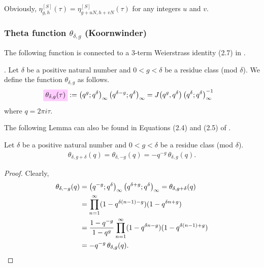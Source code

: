 \documentclass{article}
\begin{document}
Obviously, $\eta_{g,h}^{[S]}(\tau) = \eta_{g+uN,h+vN}^{[S]}(\tau)$ for
any integers $u$ and $v$.






\subsubsection{Theta function $\theta_{\delta,g}$ (Koornwinder)}

The following function is connected to a 3-term Weierstrass identity
(2.7) in \cite{Koornwinder_ThetaIdentities_2014}.

\begin{Definition}
  \cite[special case of equation (2.1)]{Koornwinder_ThetaIdentities_2014}.
  Let $\delta$ be a positive natural number and $0 < g < \delta$ be a
  residue class (mod $\delta$).
  We define the function $\theta_{\delta,g}$ as follows.
  \begin{align}
    \defineNotation[theta-delta-g-tau]{\theta_{\delta,g}(\tau)}
    &:=
      \qPochhammer{q^g}{q^\delta} \qPochhammer{q^{\delta-g}}{q^\delta}
      =
      \jacobiFunction{q^g}{q^\delta} \eulerFunction{\delta}^{-1}
      \label{eq:theta_delta-g(tau)}
  \end{align}
  where $q=2 \pi i \tau$.
\end{Definition}

The following Lemma can also be found in Equations (2.4) and (2.5) of
\cite{Koornwinder_ThetaIdentities_2014}.
\begin{Lemma}
  Let $\delta$ be a positive natural number and $0 < g < \delta$ be a
  residue class (mod $\delta$).
  \begin{gather}
    \theta_{\delta,g+\delta}(q)
      =
      \theta_{\delta,-g}(q)
      =
      -q^{-g} \, \theta_{\delta,g}(q).
      \label{eq:theta_delta-g}
  \end{gather}
\end{Lemma}
\begin{proof}
  Clearly,
  \begin{align*}
    \theta_{\delta,-g}(q)
    &=
      \left( q^{-g};q^\delta \right)_{\infty} \left( q^{\delta+g};q^\delta \right)_{\infty}
      =
      \theta_{\delta,g+\delta}(q)
    \\
    &=
      \prod_{n=1}^\infty (1-q^{\delta (n-1)-g})(1-q^{\delta n + g})
    \\
    &=
      \frac{1-q^{-g}}{1-q^g}
      \prod_{n=1}^\infty (1-q^{\delta n - g})(1-q^{\delta (n-1) + g})
    \\
    &=
      -q^{-g} \, \theta_{\delta,g}(q).
  \end{align*}
\end{proof}
\end{document}
